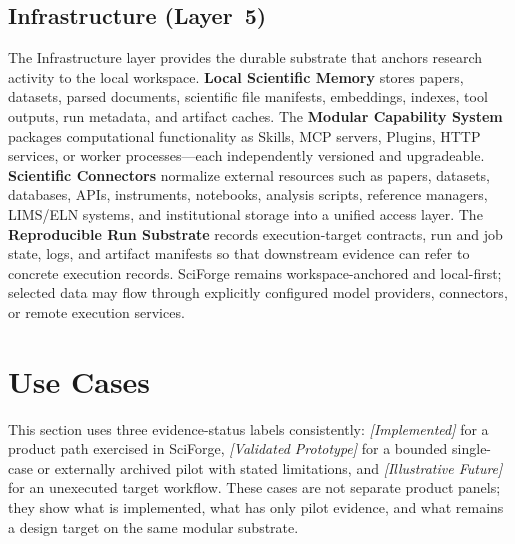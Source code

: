 \documentclass[sn-basic,Numbered,pdflatex]{sn-jnl}
\begin{document}
\subsection{Infrastructure (Layer~5)}
The Infrastructure layer provides the durable substrate that anchors research activity to the local workspace. \textbf{Local Scientific Memory} stores papers, datasets, parsed documents, scientific file manifests, embeddings, indexes, tool outputs, run metadata, and artifact caches. The \textbf{Modular Capability System} packages computational functionality as Skills, MCP servers, Plugins, HTTP services, or worker processes---each independently versioned and upgradeable. \textbf{Scientific Connectors} normalize external resources such as papers, datasets, databases, APIs, instruments, notebooks, analysis scripts, reference managers, LIMS/ELN systems, and institutional storage into a unified access layer. The \textbf{Reproducible Run Substrate} records execution-target contracts, run and job state, logs, and artifact manifests so that downstream evidence can refer to concrete execution records. SciForge remains workspace-anchored and local-first; selected data may flow through explicitly configured model providers, connectors, or remote execution services.

\section{Use Cases}


This section uses three evidence-status labels consistently: \textit{[Implemented]} for a product path exercised in SciForge, \textit{[Validated Prototype]} for a bounded single-case or externally archived pilot with stated limitations, and \textit{[Illustrative Future]} for an unexecuted target workflow. These cases are not separate product panels; they show what is implemented, what has only pilot evidence, and what remains a design target on the same modular substrate.
\end{document}

